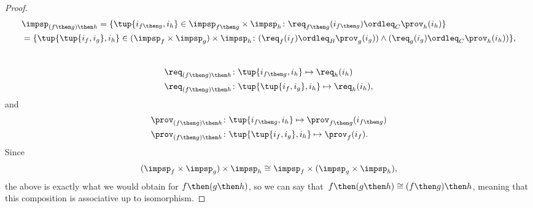 {\begin{proof}
\begin{equation}
\begin{aligned}
                 & \impsp_{(f\then g)\then h} = \{ 
                \tup{i_{f\then g},i_h} \in \impsp_{f\then g} \times \impsp_{h}\colon
                \req_{f\then g}(i_{f\then g}) \ordleq_{C} \prov_h(i_h)
                \}                                 \\
                 & =\{                             
                \tup{\tup{i_f, i_g},i_h} \in (\impsp_f \times \impsp_g) \times \impsp_{h}\colon
                (\req_f(i_f) \ordleq_{B} \prov_g(i_g))
                \wedge
                (\req_g(i_g) \ordleq_{C} \prov_h(i_h))
                \},
            \end{aligned}
        \end{equation}
        ~
        \begin{equation}
            \begin{aligned}
                \req_{(f\then g)\then h} & \colon  \tup{i_{f\then g},i_h} \mapsto \req_h(i_h)    \\
                \req_{(f\then g)\then h} & \colon  \tup{\tup{i_f, i_g},i_h} \mapsto \req_h(i_h), 
            \end{aligned}
        \end{equation}
        and
        \begin{equation}
            \begin{aligned}
                \prov_{(f\then g)\then h} & \colon  \tup{i_{f\then g},i_h} \mapsto \prov_{f\then g}(i_{f\then g}) \\
                \prov_{(f\then g)\then h} & \colon  \tup{\tup{i_f, i_g},i_h} \mapsto \prov_f(i_f).                
            \end{aligned}
        \end{equation}
        Since
        \begin{equation}
            (\impsp_f \times \impsp_g)
            \times \impsp_{h} \cong  \impsp_f \times (\impsp_g \times \impsp_{h}),
        \end{equation}
        the above is exactly what we would obtain for $f\then (g\then h)$, so we can say
        that~$f\then(g\then h)\cong (f\then g)\then h$, meaning that this composition is associative up to isomorphism.
    \end{proof}

}
